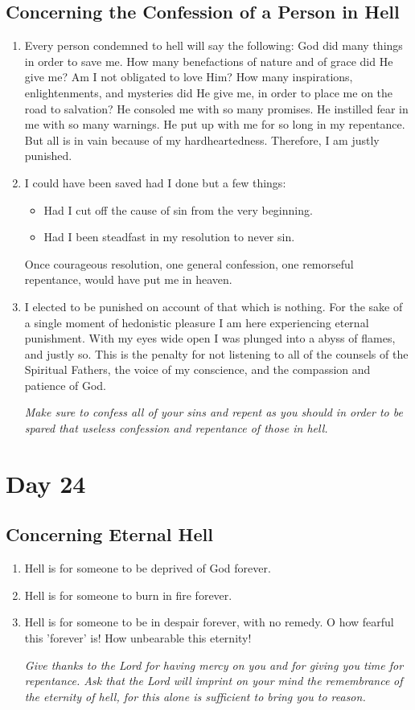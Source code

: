 \documentclass[11pt]{article}
\begin{document}
\subsection*{Concerning the Confession of a Person in Hell}
\label{sec:org0aaac2a}
\begin{enumerate}
\item Every person condemned to hell will say the following: God did many things in order to save me. How many benefactions of nature and of grace did
He give me? Am I not obligated to love Him? How many inspirations, enlightenments, and mysteries did He give me, in order to place me on the road
to salvation? He consoled me with so many promises. He instilled fear in me with so many warnings. He put up with me for so long in my repentance.
But all is in vain because of my hardheartedness. Therefore, I am justly punished.
\item I could have been saved had I done but a few things:
\begin{itemize}
\item Had I cut off the cause of sin from the very beginning.
\item Had I been steadfast in my resolution to never sin.
\end{itemize}
Once courageous resolution, one general confession, one remorseful repentance, would have put me in heaven.
\item I elected to be punished on account of that which is nothing. For the sake of a single moment of hedonistic pleasure I am here experiencing eternal
punishment. With my eyes wide open I was plunged into a abyss of flames, and justly so. This is the penalty for not listening to all of the counsels
of the Spiritual Fathers, the voice of my conscience, and the compassion and patience of God.

\emph{Make sure to confess all of your sins and repent as you should in order to be spared that useless confession and repentance of those in hell.}
\end{enumerate}
\section*{Day 24}
\label{sec:org873fe85}
\subsection*{Concerning Eternal Hell}
\label{sec:org3a79b5a}
\begin{enumerate}
\item Hell is for someone to be deprived of God forever.
\item Hell is for someone to burn in fire forever.
\item Hell is for someone to be in despair forever, with no remedy. O how fearful this 'forever' is! How unbearable this eternity!

\emph{Give thanks to the Lord for having mercy on you and for giving you time for repentance. Ask that the Lord will imprint on your mind the remembrance}
\emph{of the eternity of hell, for this alone is sufficient to bring you to reason.}
\end{enumerate}
\end{document}
